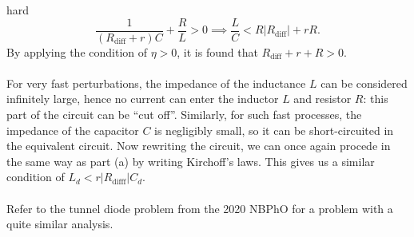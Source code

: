 \begin{solution}{hard}
\[\frac{1}{(R_{\text{diff}} + r)C} + \frac{R}{L} > 0\implies \frac{L}{C} < R |R_{\text{diff}}| + rR.\]
By applying the condition of $\eta > 0$, it is found that $R_{\text{diff}} + r + R > 0$. 
\\
\\
For very fast perturbations, the impedance of the inductance $L$ can be considered infinitely large, hence no current can enter the inductor $L$ and resistor $R$: this part of the circuit can be “cut off”. Similarly, for such fast processes, the impedance of the capacitor $C$ is negligibly small, so it can be short-circuited in the equivalent circuit. Now rewriting the circuit, we can once again procede in the same way as part (a) by writing Kirchoff's laws. This gives us a similar condition of $L_d < r|R_{\text{difff}}|C_d$. 
\\
\\
Refer to the tunnel diode problem from the 2020 NBPhO for a problem with a quite similar analysis. 
\end{solution}